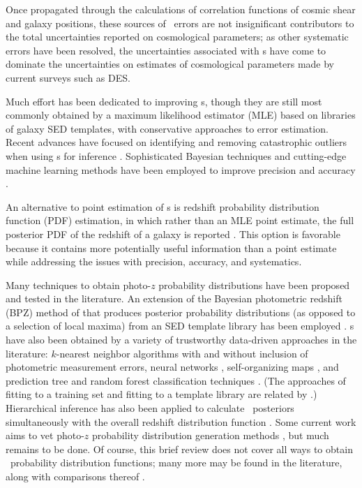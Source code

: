 Once propagated through the calculations of correlation functions of cosmic shear and galaxy positions, these sources of \pz\ errors are not insignificant contributors to the total uncertainties reported on cosmological parameters; as other systematic errors have been resolved, the uncertainties associated with \pz s have come to dominate the uncertainties on estimates of cosmological parameters made by current surveys such as DES.

Much effort has been dedicated to improving \pz s, though they are still most commonly obtained by a maximum likelihood estimator (MLE) based on libraries of galaxy SED templates, with conservative approaches to error estimation.  
Recent advances have focused on identifying and removing catastrophic outliers when using \pz s for 
inference \citep{Gorecki2014}.  
Sophisticated Bayesian techniques and cutting-edge machine learning methods have been employed to improve precision \citep{Carliles2010} and accuracy \citep{Sadeh2015}. 

An alternative to point estimation of \pz s is redshift probability distribution function (PDF) estimation, in which rather than an MLE point estimate, the full posterior PDF of the redshift of a galaxy is reported \citep{Koo1999}.  
This option is favorable because it contains more potentially useful information than a point estimate while addressing the issues with precision, accuracy, and systematics.  

Many techniques to obtain photo-$z$ probability distributions have been proposed and tested in the literature.  
An extension of the Bayesian photometric redshift (BPZ) method of \citet{Benitez2000} that produces posterior probability distributions (as opposed to a selection of local maxima) from an SED template library has been employed \citep{Hildebrandt2012, Kelly2014, Lopez-Sanjuan2015}.  
\Pzpdf s have also been obtained by a variety of trustworthy data-driven approaches in the literature: $k$-nearest neighbor algorithms with \citep{Ball2008} and without \citep{Sheldon2012} inclusion of photometric measurement errors, neural networks \citep{Bonnett2015a}, self-organizing maps \citep{CarrascoKind2014a}, and prediction tree and random forest classification techniques \citep{Carliles2010, CarrascoKind2013}.  
(The approaches of fitting to a training set and fitting to a template library are related by \citet{Budavari2009}.)  
Hierarchical inference has also been applied to calculate \pz\ posteriors simultaneously with the overall redshift distribution function \citep{Leistedt2016}.  
Some current work aims to vet photo-$z$ probability distribution generation methods \citep{Wittman2016}, but much remains to be done.  
Of course, this brief review does not cover all ways to obtain \pz\ probability distribution functions; many more may be found in the literature, along with comparisons thereof \citep{Hildebrandt2010, Dahlen2013, Sanchez2013, Bonnett2015}.

